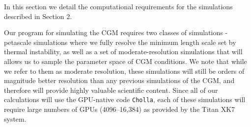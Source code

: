 \documentclass[11pt,letterpaper,english]{article}
\begin{document}




In this section we detail the computational requirements for the simulations described in Section 2. 

Our program for simulating the CGM requires two classes of simulations - petascale simulations where we fully resolve the minimum length scale set by thermal instability, as well as a set of moderate-resolution simulations that will allows us to sample the parameter space of CGM conditions. We note that while we refer to them as moderate resolution, these simulations will still be orders of magnitude better resolution than any previous simulations of the CGM, and therefore will provide highly valuable scientific content. Since all of
our calculations will use the GPU-native code {\tt Cholla}, each of these simulations will require large numbers of GPUs (4096--16,384) as provided by the Titan XK7 system.
\end{document}
